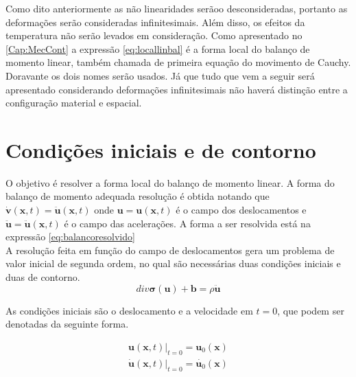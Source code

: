 Como dito anteriormente as não linearidades serãoo desconsideradas, portanto as deformações serão consideradas infinitesimais. Além disso, os efeitos da temperatura não serão levados em consideração. Como apresentado no \ref{Cap:MecCont} a expressão \ref{eq:locallinbal} é a forma local do balanço de momento linear, também chamada de primeira equação do movimento de Cauchy. Doravante os dois nomes serão usados. Já que tudo que vem a seguir será apresentado considerando deformações infinitesimais não haverá distinção entre a configuração material e espacial. 

\section{Condições iniciais e de contorno}

O objetivo é resolver a forma local do balanço de momento linear. A forma do balanço de momento adequada resolução é obtida notando que $ \dot{\boldsymbol{v}}(\boldsymbol{x},t) = \ddot{\boldsymbol{u}}(\boldsymbol{x},t) $ onde $ \boldsymbol{u} = \boldsymbol{u}(\boldsymbol{x},t)$ é o campo dos deslocamentos e $ \ddot{\boldsymbol{u}} = \ddot{\boldsymbol{u}} (\boldsymbol{x},t) $ é o campo das acelerações. A forma a ser resolvida está na expressão \ref{eq:balancoresolvido} \\ A resolução feita em função do campo de deslocamentos gera um problema de valor inicial de segunda ordem, no qual são necessárias duas condições iniciais e duas de contorno.\\

\begin{equation}\label{eq:balancoresolvido}
	div\boldsymbol{\sigma(\boldsymbol{u})} + \boldsymbol{b} = \rho \ddot{\boldsymbol{u}}
\end{equation}

As condições iniciais são o deslocamento e a velocidade em $ t = 0 $, que podem ser denotadas da seguinte forma.

\begin{align} 
	\boldsymbol{u}(\boldsymbol{x},t)|_{t=0} = \boldsymbol{u}_{0}(\boldsymbol{x}) \\
	\dot{\boldsymbol{u}}(\boldsymbol{x},t)|_{t=0} = \dot{\boldsymbol{u}_{0}}(\boldsymbol{x})
\end{align} 

